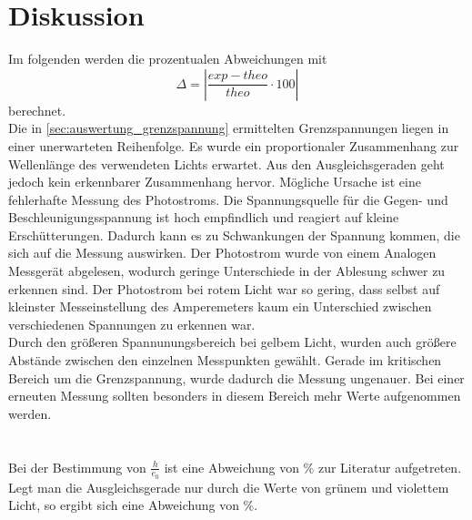 \section{Diskussion}
\label{sec:Diskussion}

Im folgenden werden die prozentualen Abweichungen mit 
\begin{equation}\label{eq:1}
    \Delta = |\frac{exp - theo}{theo} \cdot 100|
\end{equation}
berechnet.
\\
Die in \autoref{sec:auswertung_grenzspannung} ermittelten Grenzspannungen liegen in einer unerwarteten Reihenfolge.
Es wurde ein proportionaler Zusammenhang zur Wellenlänge des verwendeten Lichts erwartet.
Aus den Ausgleichsgeraden geht jedoch kein erkennbarer Zusammenhang hervor. 
Mögliche Ursache ist eine fehlerhafte Messung des Photostroms. 
Die Spannungsquelle für die Gegen- und Beschleunigungsspannung ist hoch empfindlich und reagiert auf kleine Erschütterungen.
Dadurch kann es zu Schwankungen der Spannung kommen, die sich auf die Messung auswirken.
Der Photostrom wurde von einem Analogen Messgerät abgelesen, wodurch geringe Unterschiede in der Ablesung schwer zu erkennen sind.
Der Photostrom bei rotem Licht war so gering, dass selbst auf kleinster Messeinstellung des Amperemeters kaum ein Unterschied zwischen 
verschiedenen Spannungen zu erkennen war.\\
Durch den größeren Spannunungsbereich bei gelbem Licht, wurden auch größere Abstände zwischen den einzelnen Messpunkten gewählt.
Gerade im kritischen Bereich um die Grenzspannung, wurde dadurch die Messung ungenauer. 
Bei einer erneuten Messung sollten besonders in diesem Bereich mehr Werte aufgenommen werden.\\
\\
\\
Bei der Bestimmung von $\frac{h}{e_0}$ ist eine Abweichung von $\%$ zur Literatur aufgetreten.
Legt man die Ausgleichsgerade nur durch die Werte von grünem und violettem Licht, so ergibt sich eine Abweichung von $\%$.